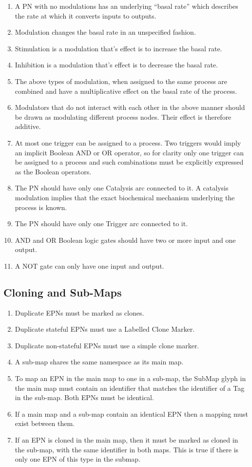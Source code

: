 \begin{enumerate}
\item A PN with no modulations has an underlying “basal rate” which describes the rate at which it converts inputs to outputs.
\item Modulation changes the basal rate in an unspecified fashion.
\item Stimulation is a modulation that’s effect is to increase the basal rate.
\item Inhibition is a modulation that’s effect is to decrease the basal rate.
\item The above types of modulation, when assigned to the same process are combined and have a multiplicative effect on the basal rate of the process.
\item Modulators that do not interact with each other in the above manner should be drawn as modulating different process nodes. Their effect is therefore additive.
\item At most one trigger can be assigned to a process. Two triggers would imply an implicit Boolean AND or OR operator, so for clarity only one trigger can be assigned to a process and such combinations must be explicitly expressed as the Boolean operators.
\item The PN should have only one Catalysis arc connected to it. A catalysis modulation implies that the exact biochemical mechanism underlying the process is known.
\item The PN should have only one Trigger arc connected to it.
\item AND and OR Boolean logic gates should have two or more input and one output.
\item A NOT gate can only have one input and output.
\end{enumerate}

\subsection{Cloning and Sub-Maps}

\begin{enumerate}
\item Duplicate EPNs must be marked as clones.
\item Duplicate stateful EPNs must use a Labelled Clone Marker.
\item Duplicate non-stateful EPNs must use a simple clone marker.
\item A sub-map shares the same namespace as its main map.
\item To map an EPN in the main map to one in a sub-map, the SubMap glyph in the main map must contain an identifier that matches the identifier of a Tag in the sub-map. Both EPNs must be identical.
\item If a main map and a sub-map contain an identical EPN then a mapping must exist between them.
\item If an EPN is cloned in the main map, then it must be marked as cloned in the sub-map, with the same identifier in both maps. This is true if there is only one EPN of this type in the submap.
\end{enumerate}
